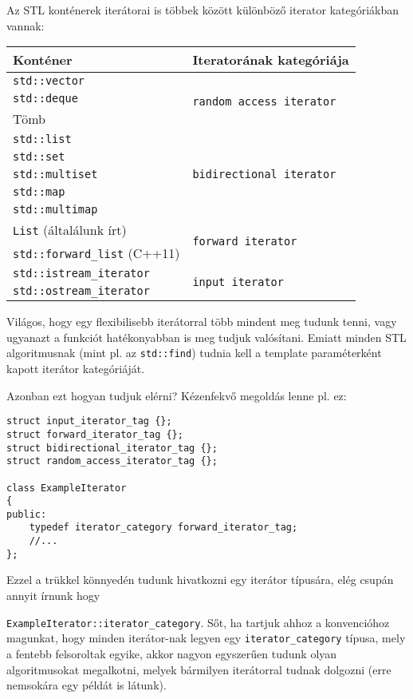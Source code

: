 \documentclass[a4paper,11.5pt,table]{article}
\begin{document}
	\smallskip
	Az STL konténerek iterátorai is többek között különböző iterator kategóriákban vannak:
	\begin{center}
		\setlength{\extrarowheight}{2pt}
		\begin{tabular}{|l|l|}
			\hline
			Konténer&Iteratorának kategóriája\\
			\hline
			\hline
			\texttt{std::vector} & \multirow{3}{*}{\texttt{random access iterator}}\\
			\texttt{std::deque} &\\
			Tömb &\\
			\hline
			\texttt{std::list} & \multirow{5}{*}{\texttt{bidirectional iterator}}\\
			\texttt{std::set} & \\
			\texttt{std::multiset} & \\
			\texttt{std::map} & \\
			\texttt{std::multimap} & \\
			\hline
			\texttt{List} (általálunk írt)& \multirow{2}{*}{\texttt{forward iterator}}\\
			\texttt{std::forward\_list} (C++11)&\\
			\hline
			\texttt{std::istream\_iterator}& \multirow{2}{*}{\texttt{input iterator}}\\
			\texttt{std::ostream\_iterator}&\\
			\hline
		\end{tabular}
	\end{center}
	Világos, hogy egy flexibilisebb iterátorral több mindent meg tudunk tenni, vagy ugyanazt a funkciót hatékonyabban is meg tudjuk valósítani. Emiatt minden STL algoritmusnak (mint pl. az \texttt{std::find}) tudnia kell a template paraméterként kapott iterátor kategóriáját.
	\medskip
	
	Azonban ezt hogyan tudjuk elérni? Kézenfekvő megoldás lenne pl. ez:
	\begin{lstlisting}
struct input_iterator_tag {};
struct forward_iterator_tag {};
struct bidirectional_iterator_tag {};
struct random_access_iterator_tag {};

class ExampleIterator
{
public:
	typedef iterator_category forward_iterator_tag;
	//...
};
	\end{lstlisting}
	Ezzel a trükkel könnyedén tudunk hivatkozni egy iterátor típusára, elég csupán annyit írnunk hogy 
	
	\texttt{ExampleIterator::iterator\_category}. Sőt, ha tartjuk ahhoz a konvencióhoz magunkat, hogy minden iterátor-nak legyen egy \texttt{iterator\_category} típusa, mely a fentebb felsoroltak egyike, akkor nagyon egyszerűen tudunk olyan algoritmusokat megalkotni, melyek bármilyen iterátorral tudnak dolgozni (erre nemsokára egy példát is látunk).
	
\end{document}
